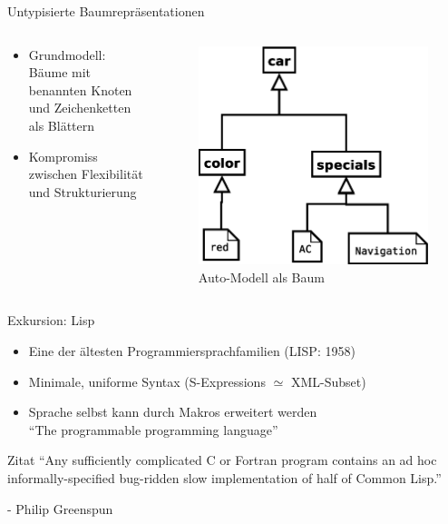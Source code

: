 \documentclass{beamer}
\begin{document}
\begin{frame}{Untypisierte Baumrepräsentationen}
  \begin{columns}
    \begin{column}{5cm}
      \begin{itemize}
      \item Grundmodell: Bäume mit benannten Knoten und Zeichenketten als Blättern
      \item Kompromiss zwischen Flexibilität und Strukturierung
      \end{itemize}
    \end{column}
    \begin{column}{5cm}
      \begin{figure}
        \centering
        \includegraphics[scale=0.3]{images/car_sexp}
        \caption{Auto-Modell als Baum}
      \end{figure}
    \end{column}
  \end{columns}
\end{frame}

\begin{frame}{Exkursion: Lisp}
  \begin{itemize}
  \item Eine der ältesten Programmiersprachfamilien (LISP: 1958)
  \item Minimale, uniforme Syntax (S-Expressions $\simeq$ XML-Subset)
  \item Sprache selbst kann durch Makros erweitert werden \\
    ``The programmable programming language''
  \end{itemize}

  \begin{block}{Zitat}
    ``Any sufficiently complicated C or Fortran program contains an ad hoc
    informally-specified bug-ridden slow implementation of half of
    Common Lisp.''

    - Philip Greenspun 
  \end{block}
\end{frame}
\end{document}
